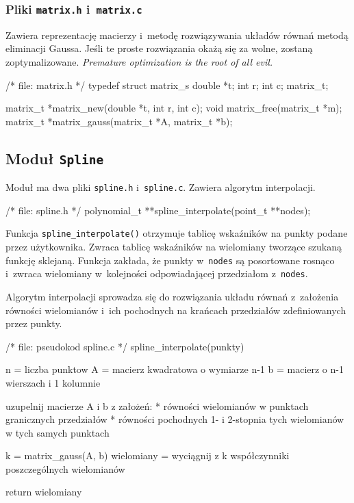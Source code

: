 \documentclass[10pt,a4paper]{article}
\newcommand{\p}[1]{\texttt{#1}}
\begin{document}
\subsubsection{Pliki \p{matrix.h} i~\p{matrix.c}}
Zawiera reprezentację macierzy i~metodę rozwiązywania układów równań metodą
eliminacji Gaussa. Jeśli te proste rozwiązania okażą się za wolne, zostaną
zoptymalizowane. \emph{Premature optimization is the root of all evil.}
\begin{SmallVerbatim}
    /* file: matrix.h */
    typedef struct matrix_s {
      double *t;
      int r;
      int c;
    } matrix_t;
    
    matrix_t *matrix_new(double *t, int r, int c);
    void matrix_free(matrix_t *m);
    matrix_t *matrix_gauss(matrix_t *A, matrix_t *b);
\end{SmallVerbatim}

\subsection{Moduł \p{Spline}}

Moduł ma dwa pliki \p{spline.h} i~\p{spline.c}. Zawiera algorytm interpolacji.
\begin{SmallVerbatim}
    /* file: spline.h */
    polynomial_t **spline_interpolate(point_t **nodes);
\end{SmallVerbatim}
Funkcja \p{spline\_interpolate()} otrzymuje tablicę wskaźników na punkty podane
przez użytkownika. Zwraca tablicę wskaźników na wielomiany tworzące szukaną
funkcję sklejaną. Funkcja zakłada, że punkty w~\p{nodes} są posortowane
rosnąco i~zwraca wielomiany w~kolejności odpowiadającej przedziałom
z~\p{nodes}.

Algorytm interpolacji sprowadza się do rozwiązania układu równań z~założenia
równości wielomianów i~ich pochodnych na krańcach przedziałów zdefiniowanych
przez punkty.
\begin{SmallVerbatim}
    /* file: pseudokod spline.c */
    spline_interpolate(punkty)
    {
      n = liczba punktow
      A = macierz kwadratowa o wymiarze n-1
      b = macierz o n-1 wierszach i 1 kolumnie
      
      uzupelnij macierze A i b z założeń:
      * równości wielomianów w punktach granicznych przedziałów
      * równości pochodnych 1- i 2-stopnia tych wielomianów w tych samych punktach
      
      k = matrix_gauss(A, b)
      wielomiany = wyciągnij z k współczynniki poszczególnych wielomianów
      
      return wielomiany
    }
\end{SmallVerbatim}
\end{document}
